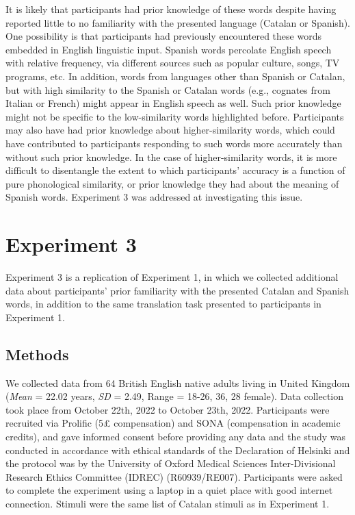\documentclass[
]{article}
\begin{document}
It is likely that participants had prior knowledge of these words
despite having reported little to no familiarity with the presented
language (Catalan or Spanish). One possibility is that participants had
previously encountered these words embedded in English linguistic input.
Spanish words percolate English speech with relative frequency, via
different sources such as popular culture, songs, TV programs, etc. In
addition, words from languages other than Spanish or Catalan, but with
high similarity to the Spanish or Catalan words (e.g., cognates from
Italian or French) might appear in English speech as well. Such prior
knowledge might not be specific to the low-similarity words highlighted
before. Participants may also have had prior knowledge about
higher-similarity words, which could have contributed to participants
responding to such words more accurately than without such prior
knowledge. In the case of higher-similarity words, it is more difficult
to disentangle the extent to which participants' accuracy is a function
of pure phonological similarity, or prior knowledge they had about the
meaning of Spanish words. Experiment 3 was addressed at investigating
this issue.

\section{Experiment 3}\label{experiment-3}

Experiment 3 is a replication of Experiment 1, in which we collected
additional data about participants' prior familiarity with the presented
Catalan and Spanish words, in addition to the same translation task
presented to participants in Experiment 1.

\subsection{Methods}\label{methods-2}

We collected data from 64 British English native adults living in United
Kingdom (\emph{Mean} = 22.02 years, \emph{SD} = 2.49, Range = 18-26, 36,
28 female). Data collection took place from October 22th, 2022 to
October 23th, 2022. Participants were recruited via Prolific (5£
compensation) and SONA (compensation in academic credits), and gave
informed consent before providing any data and the study was conducted
in accordance with ethical standards of the Declaration of Helsinki and
the protocol was by the University of Oxford Medical Sciences
Inter-Divisional Research Ethics Committee (IDREC) (R60939/RE007).
Participants were asked to complete the experiment using a laptop in a
quiet place with good internet connection. Stimuli were the same list of
Catalan stimuli as in Experiment 1.
\end{document}
